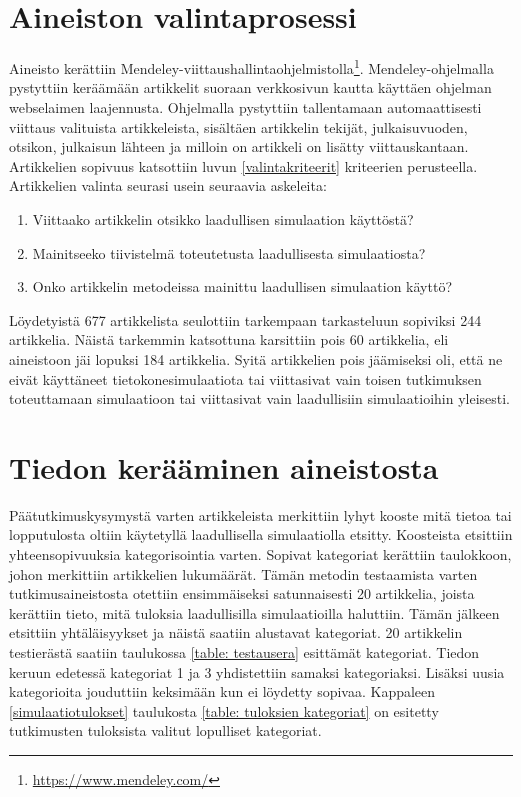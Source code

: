 \documentclass[utf8]{gradu3}
\begin{document}
\section{Aineiston valintaprosessi} \label{valintaprosessi}
Aineisto kerättiin Mendeley-viittaushallintaohjelmistolla\footnote{\url{https://www.mendeley.com/}}. Mendeley-ohjelmalla pystyttiin keräämään artikkelit suoraan verkkosivun kautta käyttäen ohjelman webselaimen laajennusta. Ohjelmalla pystyttiin tallentamaan automaattisesti viittaus valituista artikkeleista, sisältäen artikkelin tekijät, julkaisuvuoden, otsikon, julkaisun lähteen ja milloin on artikkeli on lisätty viittauskantaan. Artikkelien sopivuus katsottiin luvun \ref{valintakriteerit} kriteerien perusteella. Artikkelien valinta seurasi usein seuraavia askeleita:

\begin{enumerate}
    \item Viittaako artikkelin otsikko laadullisen simulaation käyttöstä?
    \item Mainitseeko tiivistelmä toteutetusta laadullisesta simulaatiosta?
    \item Onko artikkelin metodeissa mainittu laadullisen simulaation käyttö?
\end{enumerate}

Löydetyistä 677 artikkelista seulottiin tarkempaan tarkasteluun 
sopiviksi 244 artikkelia. 
Näistä tarkemmin katsottuna karsittiin pois 60 artikkelia, 
eli aineistoon jäi lopuksi 184 artikkelia. 
Syitä artikkelien pois jäämiseksi oli, 
että ne eivät käyttäneet tietokonesimulaatiota tai 
viittasivat vain toisen tutkimuksen toteuttamaan simulaatioon tai
viittasivat vain laadullisiin simulaatioihin yleisesti.


\section{Tiedon kerääminen aineistosta} \label{tiedon keruu}
Päätutkimuskysymystä varten artikkeleista merkittiin lyhyt kooste mitä tietoa tai lopputulosta oltiin käytetyllä laadullisella simulaatiolla etsitty. Koosteista etsittiin yhteensopivuuksia kategorisointia varten. Sopivat kategoriat kerättiin taulokkoon, johon merkittiin artikkelien lukumäärät. Tämän metodin testaamista varten tutkimusaineistosta otettiin ensimmäiseksi satunnaisesti 20 artikkelia, joista kerättiin tieto, mitä tuloksia laadullisilla simulaatioilla haluttiin. Tämän jälkeen etsittiin yhtäläisyykset ja näistä saatiin alustavat kategoriat. 20 artikkelin testierästä saatiin taulukossa \ref{table: testausera} esittämät kategoriat. Tiedon keruun edetessä kategoriat 1 ja 3 yhdistettiin samaksi kategoriaksi. Lisäksi uusia kategorioita jouduttiin keksimään kun ei löydetty sopivaa. Kappaleen \ref{simulaatiotulokset} taulukosta \ref{table: tuloksien kategoriat} on esitetty tutkimusten tuloksista valitut lopulliset kategoriat.
\end{document}
